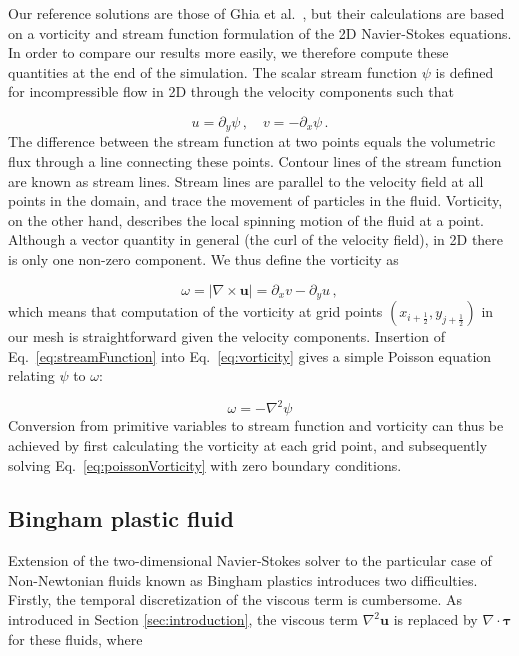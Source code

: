 \documentclass[final,3p,twocolumn]{elsarticle}
\begin{document}
Our reference solutions are those of Ghia et al.\ \cite{ghia1982high},
but their calculations are based on a vorticity and stream function formulation
of the 2D Navier-Stokes equations. In order to compare our results more
easily, we therefore compute these quantities at the end of the
simulation. The scalar stream function $\psi$ is defined for incompressible
flow in 2D through the velocity components such that 

\begin{equation}
    u = \partial_y \psi \,, \quad v = - \partial_x \psi \,.
    \label{eq:streamFunction}
\end{equation}
%
The difference between the stream function at two points equals the
volumetric flux through a line connecting these points. Contour lines of the
stream function are known as stream lines. Stream lines are parallel to the
velocity field at all points in the domain, and trace the movement of particles
in the fluid. Vorticity, on the other hand, describes the local spinning motion
of the fluid at a point. Although a vector quantity in general (the curl of the velocity
field), in 2D there is only one non-zero component. We thus define the
vorticity as 

\begin{equation}
    \omega = |\nabla \times \bm{u}| = \partial_x v - \partial_y u \,,
    \label{eq:vorticity}
\end{equation}
%
which means that computation of the vorticity at grid points
$(x_{i+\frac{1}{2}}, y_{j+\frac{1}{2}})$ in our mesh is straightforward
given the velocity components.  Insertion of Eq.\ \eqref{eq:streamFunction}
into Eq.\ \eqref{eq:vorticity} gives a simple Poisson equation relating $\psi$
to $\omega$: 

\begin{equation}
    \omega = - \nabla^2 \psi
    \label{eq:poissonVorticity}
\end{equation}
%
Conversion from primitive variables to stream function and vorticity can thus
be achieved by first calculating the vorticity at each grid point, and
subsequently solving Eq.\ \eqref{eq:poissonVorticity} with zero boundary
conditions. 

\subsection{Bingham plastic fluid}
\label{subsec:bingham}

Extension of the two-dimensional Navier-Stokes solver to the particular case of
Non-Newtonian fluids known as Bingham plastics introduces two difficulties.
Firstly, the temporal discretization of the viscous term is cumbersome. As introduced in
Section \ref{sec:introduction}, the viscous term $\nabla^2 \bm{u}$ is replaced
by $\nabla \cdot \bm{\tau}$ for these fluids, where 
\end{document}
